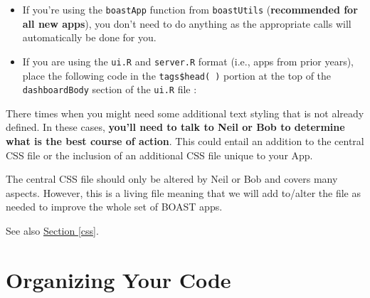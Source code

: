 \documentclass[
]{book}
\newenvironment{Shaded}{\begin{snugshade}}{\end{snugshade}}
\newcommand{\CommentTok}[1]{\textcolor[rgb]{0.56,0.35,0.01}{\textit{#1}}}
\newcommand{\DataTypeTok}[1]{\textcolor[rgb]{0.13,0.29,0.53}{#1}}
\newcommand{\DecValTok}[1]{\textcolor[rgb]{0.00,0.00,0.81}{#1}}
\newcommand{\KeywordTok}[1]{\textcolor[rgb]{0.13,0.29,0.53}{\textbf{#1}}}
\newcommand{\NormalTok}[1]{#1}
\newcommand{\OperatorTok}[1]{\textcolor[rgb]{0.81,0.36,0.00}{\textbf{#1}}}
\newcommand{\StringTok}[1]{\textcolor[rgb]{0.31,0.60,0.02}{#1}}
\providecommand{\tightlist}{%
  \setlength{\itemsep}{0pt}\setlength{\parskip}{0pt}}
\begin{document}
\begin{itemize}
\tightlist
\item
  If you're using the \texttt{boastApp} function from \texttt{boastUtils} (\textbf{recommended for all new apps}), you don't need to do anything as the appropriate calls will automatically be done for you.
\item
  If you are using the \texttt{ui.R} and \texttt{server.R} format (i.e., apps from prior years), place the following code in the \texttt{tags\$head(\ )} portion at the top of the \texttt{dashboardBody} section of the \texttt{ui.R} file :
\end{itemize}

\begin{Shaded}
\end{Shaded}

There times when you might need some additional text styling that is not already defined. In these cases, \textbf{you'll need to talk to Neil or Bob to determine what is the best course of action}. This could entail an addition to the central CSS file or the inclusion of an additional CSS file unique to your App.

The central CSS file should only be altered by Neil or Bob and covers many aspects. However, this is a living file meaning that we will add to/alter the file as needed to improve the whole set of BOAST apps.

See also \protect\hyperlink{cssc}{Section \ref{css}}.

\hypertarget{orgCodec}{%
\section{Organizing Your Code}\label{orgCodec}}
\end{document}
